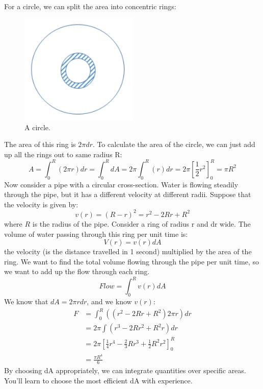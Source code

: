 \documentclass[class=report, crop=false, 12pt,a4paper]{standalone}
\begin{document}
For a circle, we can split the area into concentric rings:
\begin{figure}
  \centering
  \includegraphics[width = 0.5\textwidth]{../img/areaofcircle}
  \caption{A circle.}
\end{figure}
The area of this ring is $2\pi dr$. To calculate the area of the circle, we can just add up all the rings out to same radius R:
\begin{equation}
  A = \int_0^R (2\pi r)dr = \int_0^R dA = 2\pi \int_0^R (r) dr = 2\pi \left[ \frac{1}{2} r^2 \right]^R_0 = \pi R^2
\end{equation}
Now consider a pipe with a circular cross-section. Water is flowing steadily through the pipe, but it has a different velocity at different radii. Suppose that the velocity is given by:
\begin{equation}
  v(r) = (R-r)^2 = r^2 - 2Rr + R^2
\end{equation}
where $R$ is the radius of the pipe.
Consider a ring of radius r and dr wide. The volume of water passing through this ring per unit time is:
\begin{equation}
  V(r) = v(r)dA
\end{equation}
the velocity (is the distance travelled in 1 second) multiplied by the area of the ring.
We want to find the total volume flowing through the pipe per unit time, so we want to add up the flow through each ring.
\begin{equation}
  Flow = \int_0^R v(r)dA
\end{equation}
We know that $dA = 2\pi r dr$, and we know $v(r)$:
\begin{align}
  F &= \int_0^R ((r^2 - 2Rr + R^2)2\pi r) dr\\
  &= 2\pi \int (r^3 - 2Rr^2 + R^2r) dr\\
  &= 2\pi \left[ \frac{1}{4} r^4 - \frac{2}{3} R r^3 + \frac{1}{2} R^2 r^2 \right]^R_0\\
  &= \frac{\pi R^4}{6}
\end{align}
By choosing dA appropriately, we can integrate quantities over specific areas. You’ll learn to choose the most efficient dA with experience.
\end{document}
